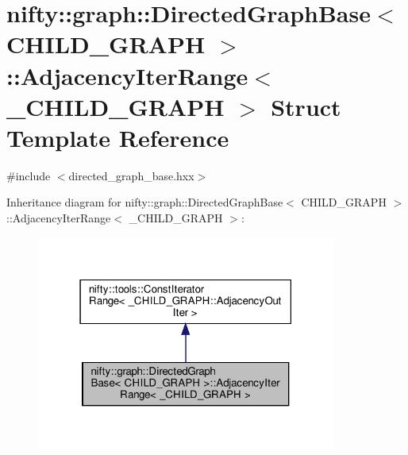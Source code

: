 \hypertarget{structnifty_1_1graph_1_1DirectedGraphBase_1_1AdjacencyIterRange}{}\section{nifty\+:\+:graph\+:\+:Directed\+Graph\+Base$<$ C\+H\+I\+L\+D\+\_\+\+G\+R\+A\+PH $>$\+:\+:Adjacency\+Iter\+Range$<$ \+\_\+\+C\+H\+I\+L\+D\+\_\+\+G\+R\+A\+PH $>$ Struct Template Reference}
\label{structnifty_1_1graph_1_1DirectedGraphBase_1_1AdjacencyIterRange}


{\ttfamily \#include $<$directed\+\_\+graph\+\_\+base.\+hxx$>$}



Inheritance diagram for nifty\+:\+:graph\+:\+:Directed\+Graph\+Base$<$ C\+H\+I\+L\+D\+\_\+\+G\+R\+A\+PH $>$\+:\+:Adjacency\+Iter\+Range$<$ \+\_\+\+C\+H\+I\+L\+D\+\_\+\+G\+R\+A\+PH $>$\+:
\nopagebreak
\begin{figure}[H]
\begin{center}
\leavevmode
\includegraphics[width=279pt]{structnifty_1_1graph_1_1DirectedGraphBase_1_1AdjacencyIterRange__inherit__graph}
\end{center}
\end{figure}



